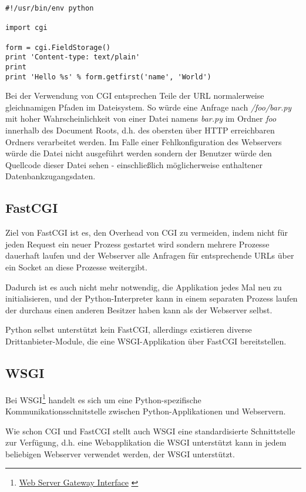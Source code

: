 \begin{lstlisting}[caption=Python-CGI-Script,label=lst:python-cgi]
#!/usr/bin/env python

import cgi

form = cgi.FieldStorage()
print 'Content-type: text/plain'
print
print 'Hello %s' % form.getfirst('name', 'World')
\end{lstlisting}

Bei der Verwendung von CGI entsprechen Teile der URL normalerweise gleichnamigen Pfaden im
Dateisystem. So würde eine Anfrage nach \emph{/foo/bar.py} mit hoher Wahrscheinlichkeit von einer
Datei namens \emph{bar.py} im Ordner \emph{foo} innerhalb des Document Roots, d.h. des obersten über
HTTP erreichbaren Ordners verarbeitet werden. Im Falle einer Fehlkonfiguration des Webservers würde
die Datei nicht ausgeführt werden sondern der Benutzer würde den Quellcode dieser Datei sehen -
einschließlich möglicherweise enthaltener Datenbankzugangsdaten.

\subsection{FastCGI}

Ziel von FastCGI ist es, den Overhead von CGI zu vermeiden, indem nicht für jeden Request ein neuer
Prozess gestartet wird sondern mehrere Prozesse dauerhaft laufen und der Webserver alle Anfragen für
entsprechende URLs über ein Socket an diese Prozesse weitergibt.

Dadurch ist es auch nicht mehr notwendig, die Applikation jedes Mal neu zu initialisieren, und der
Python-Interpreter kann in einem separaten Prozess laufen der durchaus einen anderen Besitzer haben
kann als der Webserver selbst.

Python selbst unterstützt kein FastCGI, allerdings existieren diverse Drittanbieter-Module, die
eine WSGI-Applikation über FastCGI bereitstellen.

\subsection{WSGI}

Bei WSGI\footnote{\href{http://www.python.org/dev/peps/pep-0333/}{Web Server Gateway
Interface} \citep{wsgi}}
handelt es sich um eine Python-spezifische Kommunikationsschnitstelle zwischen Python-Applikationen
und Webservern.

Wie schon CGI und FastCGI stellt auch WSGI eine standardisierte Schnittstelle zur Verfügung, d.h.
eine Webapplikation die WSGI unterstützt kann in jedem beliebigen Webserver verwendet werden, der
WSGI unterstützt.

